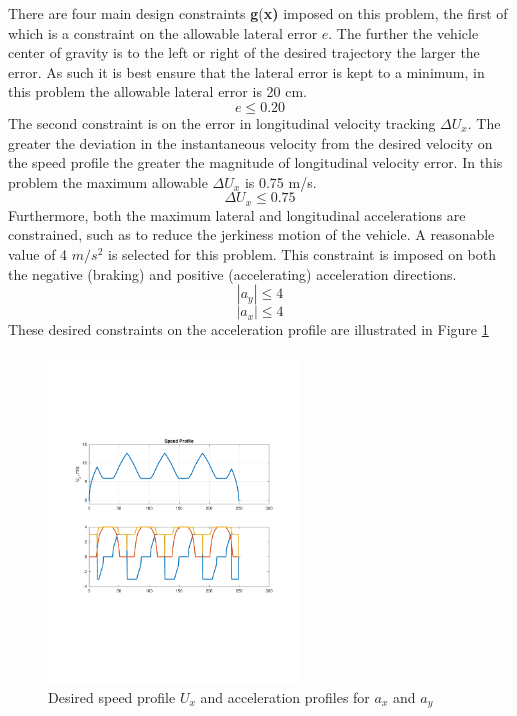 \documentclass[conf]{new-aiaa}
\begin{document}
There are four main design constraints \textbf{g}(\textbf{x)} imposed on this problem, the first of which is a constraint on the allowable lateral error $e$. The further the vehicle center of gravity is to the left or right of the desired trajectory the larger the error. As such it is best ensure that the lateral error is kept to a minimum, in this problem the allowable lateral error is 20 cm.
\[e\leq0.20\]
The second constraint is on the error in longitudinal velocity tracking $\Delta U_x$. The greater the deviation in the instantaneous velocity from the desired velocity on the speed profile the greater the magnitude of longitudinal velocity error. In this problem the maximum allowable $\Delta U_x$ is 0.75 m/s.
\[\Delta U_x\leq0.75\]
Furthermore, both the maximum lateral and longitudinal accelerations are constrained, such as to reduce the jerkiness motion of the vehicle. A reasonable value of 4 $m/s^2$ is selected for this problem. This constraint is imposed on both the negative (braking) and positive (accelerating) acceleration directions.
\[|a_y|\leq4\]
\[|a_x|\leq4\]
These desired constraints on the acceleration profile are illustrated in Figure \ref{fig:des-acc-profile}
\begin{figure}[htb]
    \begin{center}
        \vspace{-35mm}
        \includegraphics[width =0.6\textwidth]{Desired_Profiles.pdf}
        \vspace{-35mm}
        \caption{Desired speed profile $U_x$ and acceleration profiles for $a_x$ and $a_y$}
        \label{fig:des-acc-profile}
    \end{center}
\end{figure}
\vspace{-10mm}
\end{document}
